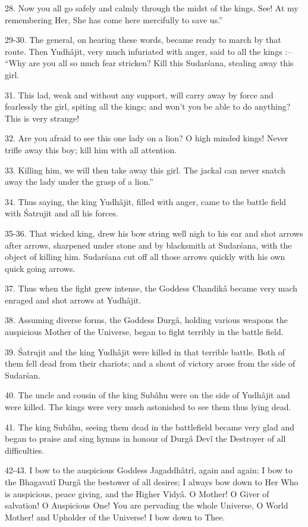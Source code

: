 28. Now you all go safely and calmly through the midst of the kings. See! At my remembering Her, She has come here mercifully to save us.''

29-30. The general, on hearing these words, became ready to march by that route. Then Yudh\^ajit, very much infuriated with anger, said to all the kings :-- ``Why are you all so much fear stricken? Kill this Sudar\'sana, stealing away this girl.

31. This lad, weak and without any support, will carry away by force and fearlessly the girl, spiting all the kings; and won't you be able to do anything? This is very strange!

32. Are you afraid to see this one lady on a lion? O high minded kings! Never trifle away this boy; kill him with all attention.

33. Killing him, we will then take away this girl. The jackal can never snatch away the lady under the grasp of a lion.''

34. Thus saying, the king Yudh\^ajit, filled with anger, came to the battle field with \'Satrujit and all his forces.

35-36. That wicked king, drew his bow string well nigh to his ear and shot arrows after arrows, sharpened under stone and by blacksmith at Sudar\'sana, with the object of killing him. Sudar\'sana cut off all those arrows quickly with his own quick going arrows.

37. Thus when the fight grew intense, the Goddess Chandik\^a became very mach enraged and shot arrows at Yudh\^ajit.

38. Assuming diverse forms, the Goddess Durg\^a, holding various weapons the auspicious Mother of the Universe, began to fight terribly in the battle field.

39. \'Satrujit and the king Yudh\^ajit were killed in that terrible battle. Both of them fell dead from their chariots; and a shout of victory arose from the side of Sudar\'san.

40. The uncle and cousin of the king Sub\^ahu were on the side of Yudh\^ajit and were killed. The kings were very much astonished to see them thus lying dead.

41. The king Sub\^ahu, seeing them dead in the battlefield became very glad and began to praise and sing hymns in honour of Durg\^a Dev\^i the Destroyer of all difficulties.

42-43. I bow to the auspicious Goddess Jagaddh\^atr\^i, again and again; I bow to the Bhagavat\^i Durg\^a the bestower of all desires; I always bow down to Her Who is auspicious, peace giving, and the Higher Vidy\^a. O Mother! O Giver of salvation! O Auspicious One! You are pervading the whole Universe, O World Mother! and Upholder of the Universe! I bow down to Thee.

